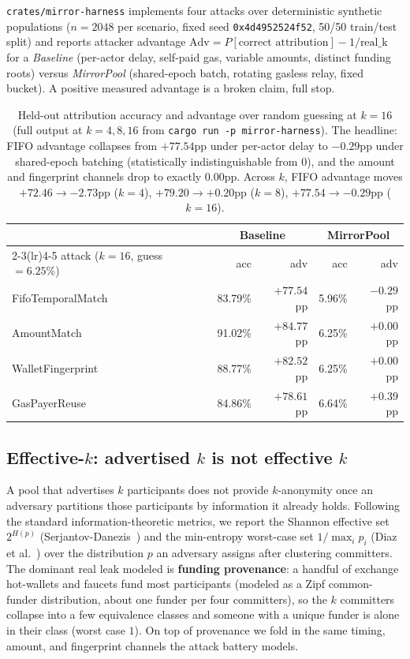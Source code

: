\documentclass[10pt]{article}
\newcommand{\code}[1]{\texttt{#1}}
\begin{document}
\code{crates/mirror-harness} implements four attacks over deterministic synthetic
populations ($n=2048$ per scenario, fixed seed \code{0x4d4952524f52},
50/50 train/test split) and reports attacker advantage
$\text{Adv} = P[\text{correct attribution}] - 1/\text{real\_k}$ for a
\emph{Baseline} (per-actor delay, self-paid gas, variable amounts, distinct
funding roots) versus \emph{MirrorPool} (shared-epoch batch, rotating gasless
relay, fixed bucket). A positive measured advantage is a broken claim, full stop.

\begin{table}[h]
\centering
\small
\begin{tabular}{@{}lrrrr@{}}
\toprule
& \multicolumn{2}{c}{\textbf{Baseline}} & \multicolumn{2}{c}{\textbf{MirrorPool}} \\
\cmidrule(lr){2-3}\cmidrule(lr){4-5}
attack ($k=16$, guess $=6.25\%$) & acc & adv & acc & adv \\
\midrule
FifoTemporalMatch  & 83.79\% & $+77.54$pp & 5.96\% & $-0.29$pp \\
AmountMatch        & 91.02\% & $+84.77$pp & 6.25\% & $+0.00$pp \\
WalletFingerprint  & 88.77\% & $+82.52$pp & 6.25\% & $+0.00$pp \\
GasPayerReuse      & 84.86\% & $+78.61$pp & 6.64\% & $+0.39$pp \\
\bottomrule
\end{tabular}
\caption{Held-out attribution accuracy and advantage over random guessing at
$k=16$ (full output at $k=4,8,16$ from \code{cargo run -p mirror-harness}). The
headline: FIFO advantage collapses from $+77.54$pp under per-actor delay to
$-0.29$pp under shared-epoch batching (statistically indistinguishable from $0$),
and the amount and fingerprint channels drop to exactly $0.00$pp. Across $k$, FIFO
advantage moves $+72.46 \to -2.73$pp ($k{=}4$), $+79.20 \to +0.20$pp ($k{=}8$),
$+77.54 \to -0.29$pp ($k{=}16$).}
\end{table}

\subsection{Effective-$k$: advertised $k$ is not effective $k$}

A pool that advertises $k$ participants does not provide $k$-anonymity once an
adversary partitions those participants by information it already holds. Following
the standard information-theoretic metrics, we report the Shannon effective set
$2^{H(p)}$ (Serjantov-Danezis~\cite{serjantov}) and the min-entropy worst-case set
$1/\max_i p_i$ (Diaz et al.~\cite{diaz}) over the distribution $p$ an adversary
assigns after clustering committers. The dominant real leak modeled is
\textbf{funding provenance}: a handful of exchange hot-wallets and faucets fund
most participants (modeled as a Zipf common-funder distribution, about one funder
per four committers), so the $k$ committers collapse into a few equivalence
classes and someone with a unique funder is alone in their class (worst case $1$).
On top of provenance we fold in the same timing, amount, and fingerprint channels
the attack battery models.
\end{document}
